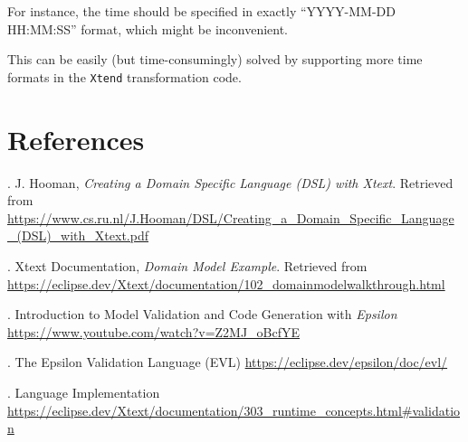 \documentclass[12pt, letterpaper, twoside]{article}
\begin{document}
For instance, the time should be specified in exactly ``YYYY-MM-DD HH:MM:SS'' format, which might be inconvenient.

This can be easily (but time-consumingly) solved by supporting more time formats in the \texttt{Xtend} transformation code.





\newpage

\section{References}
. J. Hooman, \textit{Creating a Domain Specific Language (DSL) with Xtext}. Retrieved from \url{https://www.cs.ru.nl/J.Hooman/DSL/Creating_a_Domain_Specific_Language_(DSL)_with_Xtext.pdf}

. Xtext Documentation, \textit{Domain Model Example}. Retrieved from \url{https://eclipse.dev/Xtext/documentation/102_domainmodelwalkthrough.html}


. Introduction to Model Validation and Code Generation with \textit{Epsilon} \url{https://www.youtube.com/watch?v=Z2MJ_oBcfYE}

. The Epsilon Validation Language (EVL) \url{https://eclipse.dev/epsilon/doc/evl/}

. Language Implementation \url{https://eclipse.dev/Xtext/documentation/303_runtime_concepts.html#validation}
\end{document}
